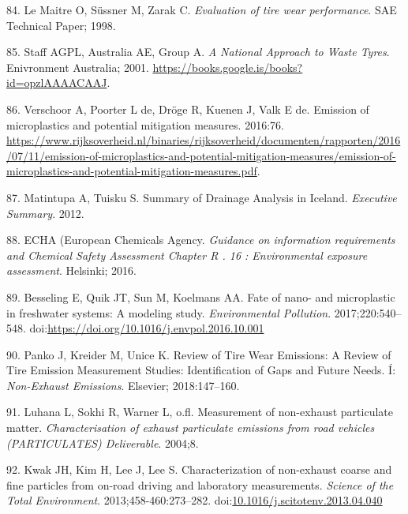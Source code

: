 \documentclass[icelandic,]{book}
\begin{document}
\leavevmode\hypertarget{ref-le1998evaluation}{}%
84. Le Maitre O, Süssner M, Zarak C. \emph{Evaluation of tire wear performance}. SAE Technical Paper; 1998.

\leavevmode\hypertarget{ref-atech2001national}{}%
85. Staff AGPL, Australia AE, Group A. \emph{A National Approach to Waste Tyres}. Enivronment Australia; 2001. \url{https://books.google.is/books?id=opzlAAAACAAJ}.

\leavevmode\hypertarget{ref-Verschoor2016}{}%
86. Verschoor A, Poorter L de, Dröge R, Kuenen J, Valk E de. Emission of microplastics and potential mitigation measures. 2016:76. \url{https://www.rijksoverheid.nl/binaries/rijksoverheid/documenten/rapporten/2016/07/11/emission-of-microplastics-and-potential-mitigation-measures/emission-of-microplastics-and-potential-mitigation-measures.pdf}.

\leavevmode\hypertarget{ref-Matinupa2012Summary}{}%
87. Matintupa A, Tuisku S. Summary of Drainage Analysis in Iceland. \emph{Executive Summary}. 2012.

\leavevmode\hypertarget{ref-ECHA2016}{}%
88. ECHA (European Chemicals Agency. \emph{Guidance on information requirements and Chemical Safety Assessment Chapter R . 16 : Environmental exposure assessment}. Helsinki; 2016.

\leavevmode\hypertarget{ref-BESSELING2017540}{}%
89. Besseling E, Quik JT, Sun M, Koelmans AA. Fate of nano- and microplastic in freshwater systems: A modeling study. \emph{Environmental Pollution}. 2017;220:540--548. doi:\href{https://doi.org/https://doi.org/10.1016/j.envpol.2016.10.001}{https://doi.org/10.1016/j.envpol.2016.10.001}

\leavevmode\hypertarget{ref-panko2018review}{}%
90. Panko J, Kreider M, Unice K. Review of Tire Wear Emissions: A Review of Tire Emission Measurement Studies: Identification of Gaps and Future Needs. Í: \emph{Non-Exhaust Emissions}. Elsevier; 2018:147--160.

\leavevmode\hypertarget{ref-luhana2004measurement}{}%
91. Luhana L, Sokhi R, Warner L, o.fl. Measurement of non-exhaust particulate matter. \emph{Characterisation of exhaust particulate emissions from road vehicles (PARTICULATES) Deliverable}. 2004;8.

\leavevmode\hypertarget{ref-Kwak2013}{}%
92. Kwak JH, Kim H, Lee J, Lee S. Characterization of non-exhaust coarse and fine particles from on-road driving and laboratory measurements. \emph{Science of the Total Environment}. 2013;458-460:273--282. doi:\href{https://doi.org/10.1016/j.scitotenv.2013.04.040}{10.1016/j.scitotenv.2013.04.040}
\end{document}
